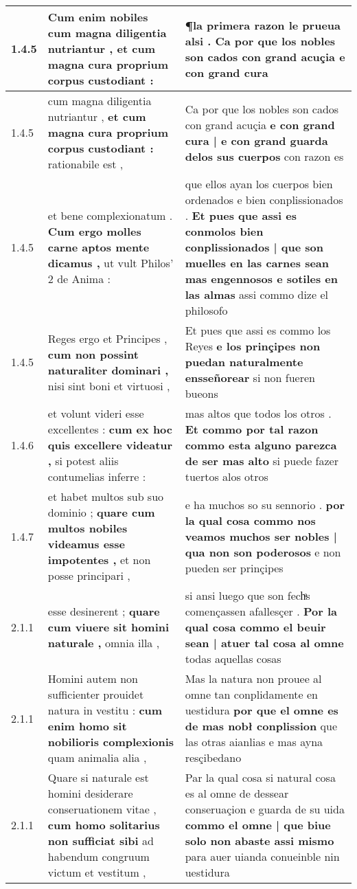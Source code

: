 \begin{tabular}{|p{1cm}|p{6.5cm}|p{6.5cm}|}
1.4.5 & Cum enim nobiles \textbf{ cum magna diligentia nutriantur , } et cum magna cura proprium corpus custodiant : & ¶la primera razon le prueua alsi . \textbf{ Ca por que los nobles son cados con grand acuçia } e con grand cura \\\hline
1.4.5 & cum magna diligentia nutriantur , \textbf{ et cum magna cura proprium corpus custodiant : } rationabile est , & Ca por que los nobles son cados con grand acuçia \textbf{ e con grand cura | e con grand guarda delos sus cuerpos } con razon es \\\hline
1.4.5 & et bene complexionatum . \textbf{ Cum ergo molles carne aptos mente dicamus , } ut vult Philos’ 2 de Anima : & que ellos ayan los cuerpos bien ordenados e bien conplissionados . \textbf{ Et pues que assi es conmolos bien conplissionados | que son muelles en las carnes sean mas engennosos e sotiles en las almas } assi commo dize el philosofo \\\hline
1.4.5 & Reges ergo et Principes , \textbf{ cum non possint naturaliter dominari , } nisi sint boni et virtuosi , & Et pues que assi es commo los Reyes \textbf{ e los prinçipes non puedan naturalmente ensseñorear } si non fueren bueons \\\hline
1.4.6 & et volunt videri esse excellentes : \textbf{ cum ex hoc quis excellere videatur , } si potest aliis contumelias inferre : & mas altos que todos los otros . \textbf{ Et commo por tal razon commo esta alguno parezca de ser mas alto } si puede fazer tuertos alos otros \\\hline
1.4.7 & et habet multos sub suo dominio ; \textbf{ quare cum multos nobiles videamus esse impotentes , } et non posse principari , & e ha muchos so su sennorio . \textbf{ por la qual cosa commo nos veamos muchos ser nobles | qua non son poderosos } e non pueden ser prinçipes \\\hline
2.1.1 & esse desinerent ; \textbf{ quare cum viuere sit homini naturale , } omnia illa , & si ansi luego que son fechͣs començassen afallesçer . \textbf{ Por la qual cosa commo el beuir sean | atuer tal cosa al omne } todas aquellas cosas \\\hline
2.1.1 & Homini autem non sufficienter prouidet natura in vestitu : \textbf{ cum enim homo sit nobilioris complexionis } quam animalia alia , & Mas la natura non prouee al omne tan conplidamente en uestidura \textbf{ por que el omne es de mas nobł conplission } que las otras aianlias e mas ayna resçibedano \\\hline
2.1.1 & Quare si naturale est homini desiderare conseruationem vitae , \textbf{ cum homo solitarius non sufficiat sibi } ad habendum congruum victum et vestitum , & Par la qual cosa si natural cosa es al omne de dessear conseruaçion e guarda de su uida \textbf{ commo el omne | que biue solo non abaste assi mismo } para auer uianda conueinble nin uestidura \\\hline

\end{tabular}
